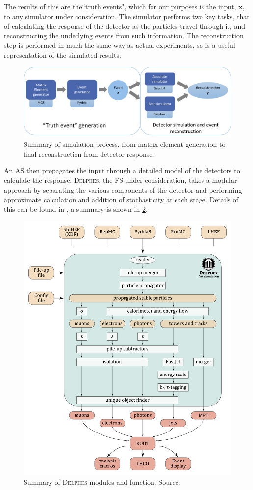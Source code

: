 \documentclass{report}
\newcommand{\pkg}[1]{\textsc{#1}}
\begin{document}
The results of this are the``truth events", which for our purposes is the input, $\mathbf{x}$, to any simulator under consideration. The simulator performs two key tasks, that of calculating the response of the detector as the particles travel through it, and reconstructing the underlying events from such information. The reconstruction step is performed in much the same way as actual experiments, so is a useful representation of the simulated results.        

\begin{figure}[H]
	\centering
	\includegraphics[width=0.8\linewidth]{simdiag}
	
	\caption{Summary of simulation process, from matrix element generation to final reconstruction from detector response.}
	\label{fig:simdiag}
	
\end{figure}	


An AS then propagates the input through a detailed model of the detectors to calculate the response. \pkg{Delphes}, the FS under consideration, takes a modular approach by separating the various components of the detector and performing approximate calculation and addition of stochasticity at each stage. Details of this can be found in \cite{delphes}, a summary is shown in \cref{fig:delphes}.


\begin{figure}[H]
	\centering
	\includegraphics[width=0.6\linewidth]{delphes}
	
	\caption{Summary of \pkg{Delphes} modules and function. Source: \cite{delphesslid}}
	\label{fig:delphes}
	
\end{figure}
\end{document}
